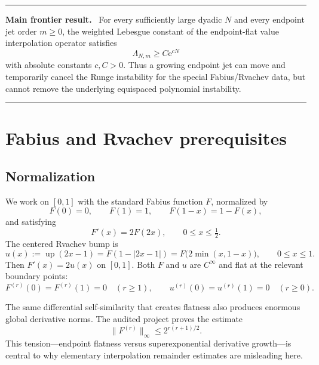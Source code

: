 \documentclass[11pt,oneside]{article}
\numberwithin{equation}{section}
\theoremstyle{definition}
\theoremstyle{remark}
\newcommand{\upf}{\operatorname{up}}
\newcommand{\e}{\mathrm e}
\newcommand{\Leb}{\Lambda}
\newenvironment{resultbox}[1]{%
  \par\medskip\noindent\begin{center}\begin{minipage}{0.94\textwidth}%
  \color{deepgreen}\hrule\vspace{0.65em}%
  \color{black}\textbf{\color{deepgreen}#1.}\ }{%
  \par\vspace{0.65em}\color{deepgreen}\hrule
  \end{minipage}\end{center}\medskip}
\begin{document}
\begin{resultbox}{Main frontier result}
For every sufficiently large dyadic $N$ and every endpoint jet order $m\ge0$, the weighted
Lebesgue constant of the endpoint-flat value interpolation operator satisfies
\[
  \Leb_{N,m}\ge C\e^{cN}
\]
with absolute constants $c,C>0$.  Thus a growing endpoint jet can move and temporarily
cancel the Runge instability for the special Fabius/Rvachev data, but cannot remove the
underlying equispaced polynomial instability.
\end{resultbox}

\section{Fabius and Rvachev prerequisites}
\label{sec:preliminaries}

\subsection{Normalization}

We work on $[0,1]$ with the standard Fabius function $F$, normalized by
\begin{equation}
 F(0)=0,\qquad F(1)=1,\qquad F(1-x)=1-F(x),
 \label{eq:fabius-symmetry}
\end{equation}
and satisfying
\begin{equation}
 F'(x)=2F(2x),\qquad 0\le x\le \tfrac12.
 \label{eq:fabius-differential}
\end{equation}
The centered Rvachev bump is
\begin{equation}
 u(x):=\upf(2x-1)=F(1-|2x-1|)=F\bigl(2\min(x,1-x)\bigr),
 \qquad 0\le x\le1.
 \label{eq:up-fabius}
\end{equation}
Then $F'(x)=2u(x)$ on $[0,1]$.  Both $F$ and $u$ are $C^\infty$ and flat at the relevant
boundary points:
\begin{equation}
 F^{(r)}(0)=F^{(r)}(1)=0\quad(r\ge1),
 \qquad
 u^{(r)}(0)=u^{(r)}(1)=0\quad(r\ge0).
 \label{eq:flatness}
\end{equation}

The same differential self-similarity that creates flatness also produces enormous global
derivative norms.  The audited project proves the estimate
\begin{equation}
 \lVert F^{(r)}\rVert_\infty\le 2^{r(r+1)/2}.
 \label{eq:derivative-growth}
\end{equation}
This tension---endpoint flatness versus superexponential derivative growth---is central to
why elementary interpolation remainder estimates are misleading here.
\end{document}
